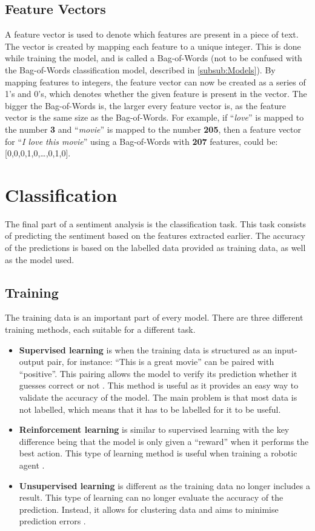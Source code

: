 \subsection{Feature Vectors}\label{sub:FeatureVector}
A feature vector is used to denote which features are present in a piece of
text. The vector is created by mapping each feature to a unique integer. This
is done while training the model, and is called a Bag-of-Words (not to be
confused with the Bag-of-Words classification model, described in
\autoref{subsub:Models}). 
By mapping features to integers, the feature vector can now be created as a
series of 1's and 0's, which denotes whether the given feature is present in
the vector. The bigger the Bag-of-Words is, the larger every feature vector is,
as the feature vector is the same size as the Bag-of-Words.
For example, if ``\textit{love}'' is mapped to the number \textbf{3} and
``\textit{movie}'' is mapped to the number \textbf{205}, then a feature vector
for ``\textit{I love this movie}'' using a Bag-of-Words with \textbf{207}
features, could be: [0,0,0,1,0,\ldots,0,1,0].


\section{Classification}\label{sec:Class}
The final part of a sentiment analysis is the classification task. This task
consists of predicting the sentiment based on the features extracted earlier.
The accuracy of the predictions is based on the labelled data provided as
training data, as well as the model used.

\subsection{Training}\label{subsec:Train}
The training data is an important part of every model. There are three
different training methods, each suitable for a different task.

\begin{itemize}
  \item \textbf{Supervised learning} is when the training data is structured as
  an input-output pair, for instance: ``This is a great movie'' can be paired with
  ``positive''. This pairing allows the model to verify its prediction whether
  it guesses correct or not \citep[Ch. 7.0]{MIBook}. This method is useful as it
  provides an easy way to validate the accuracy of the model. The main problem
  is that most data is not labelled, which means that it has to be labelled for
  it to be useful.
  \item \textbf{Reinforcement learning} is similar to supervised learning with
  the key difference being that the model is only given a ``reward'' when it
  performs the best action. This type of learning method is useful when training
  a robotic agent \citep{Reinforcement}.
  \item \textbf{Unsupervised learning} is different as the training data no
  longer includes a result. This type of learning can no longer evaluate the
  accuracy of the prediction. Instead, it allows for clustering data and aims to
  minimise prediction errors \citep[Ch. 11.1]{MIBook}.
\end{itemize}

